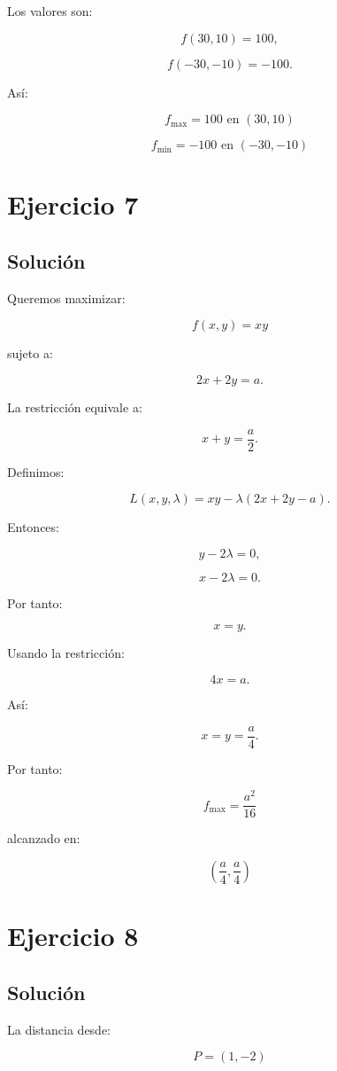 \documentclass[11pt,a4paper]{article}
\begin{document}
Los valores son:

\[
f(30,10)=100,
\]

\[
f(-30,-10)=-100.
\]

Así:

\[
\boxed{
f_{\max}=100
\text{ en }(30,10)
}
\]

\[
\boxed{
f_{\min}=-100
\text{ en }(-30,-10)
}
\]

\section{Ejercicio 7}
\subsection{Solución}

Queremos maximizar:

\[
f(x,y)=xy
\]

sujeto a:

\[
2x+2y=a.
\]

La restricción equivale a:

\[
x+y=\frac a2.
\]

Definimos:

\[
L(x,y,\lambda)
=
xy-\lambda\left(2x+2y-a\right).
\]

Entonces:

\[
y-2\lambda=0,
\]

\[
x-2\lambda=0.
\]

Por tanto:

\[
x=y.
\]

Usando la restricción:

\[
4x=a.
\]

Así:

\[
x=y=\frac a4.
\]

Por tanto:

\[
\boxed{
f_{\max}
=
\frac{a^2}{16}
}
\]

alcanzado en:

\[
\boxed{
\left(\frac a4,\frac a4\right)
}
\]

\section{Ejercicio 8}
\subsection{Solución}

La distancia desde:

\[
P=(1,-2)
\]
\end{document}
